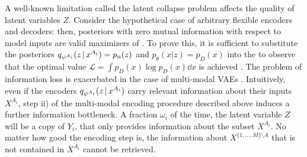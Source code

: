 

A well-known limitation called the latent collapse problem \citep{alemi2018fixing,dieng2019avoiding} affects the quality of latent variables $Z$. Consider the hypothetical case of arbitrary flexible encoders and decoders: then, posteriors with zero mutual information with respect to model inputs are valid maximizers of . To prove this, it is sufficient to substitute the posteriors $q_{\psi^{A_i}}(z\,|\, x^{A_i})=p_n(z)$ and $p_\theta(x|z)=p_D(x)$ into the  to observe that the optimal value $\mathcal{L}=\int p_D(x)\log p_D(x)\dd x$ is achieved \citep{alemi2018fixing,dieng2019avoiding}.
The problem of information loss is exacerbated in the case of multi-modal \glspl{VAE} \citep{Daunhawer2021}. 
Intuitively, even if the encoders $q_{\psi^{A_i}}(z\,|\, x^{A_i})$ carry relevant information about their inputs $X^{A_i}$, step ii) of the multi-modal encoding procedure described above induces a further information bottleneck. A fraction $\omega_i$ of the time, the latent variable $Z$ will be a copy of $Y_i$, that only provides information about the subset $X^{A_i}$. No matter how good the encoding step is, the information about $X^{\{1,\dots,M\}\setminus A}$ that is not contained in $X^{A_i}$ cannot be retrieved.

